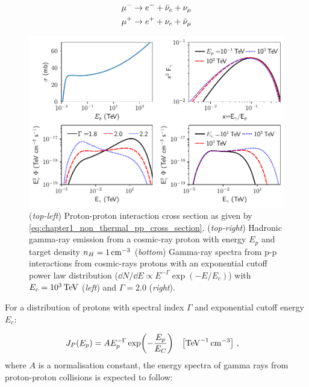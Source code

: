 \begin{equation}
    \begin{aligned}
    \muonminus &\rightarrow e^- + \bar{\nu}_e+\nu_\mu \\
    \muonplus &\rightarrow e^+ + \nu_e + \bar{\nu}_\mu
    \end{aligned}
\end{equation}
\begin{figure}[b!]
    \centering
    \includegraphics[width=\textwidth]{04_Introduction/Images/non_thermal_emission/hadronic_interaction.pdf}
    \caption{(\textit{top-left}) Proton-proton interaction cross section as given by \autoref{eq:chapter1_non_thermal_pp_cross_section}. (\textit{top-right}) Hadronic gamma-ray emission from a cosmic-ray proton with energy $E_p$ and target density $n_H=1\,\si{\per\centi\meter\cubed}$ (\textit{bottom}) Gamma-ray spectra from p-p interactions from cosmic-rays protons with an exponential cutoff power law distribution ($\dd{N}/\dd{E}\propto E^{-\Gamma}\exp(-E/E_c)$) with $E_c=10^3\,\TeV$ (\textit{left}) and $\Gamma=2.0$ (\textit{right}).}
    \label{fig:chapter_1_non_thermal_hadronic_emission}
\end{figure}
\newpar
For a distribution of protons with spectral index $\Gamma$ and exponential cutoff energy $E_c$:

\begin{equation}
    \begin{aligned}
    J_P\qty(E_p) &= A E_p^{-\Gamma} \exp(-\frac{E_p}{E_C})\quad\qty[\si{\per\tera\electronvolt\per\centi\meter\cubed}]\text{ ,}
    \end{aligned}
\end{equation}
\noindent where $A$ is a normalisation constant, the energy spectra of gamma rays from proton-proton collisions is expected to follow:

